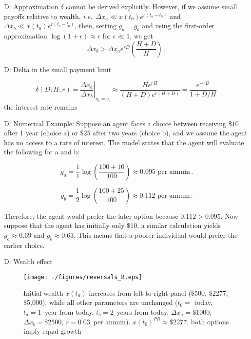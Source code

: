 \documentclass{beamer}
\newcommand{\ie}{{\it i.e.}\ }
\newcommand{\flabel}[1]{\label{fig:#1}}
\newcommand{\be}{\begin{equation}}
\newcommand{\ee}{\end{equation}}
\newcommand{\Dx}{\Delta x}
\newcommand{\del}{D}
\newcommand{\hor}{H}
\numberwithin{equation}{section}
\begin{document}
\begin{frame}{D: Approximation}
$\delta$ cannot be derived explicitly. However, if we assume small payoffs relative to wealth, \ie $\Dx_a \ll x\left(t_0\right)e^{r(t_a-t_0)}$ and $\Dx_b \ll x\left(t_0\right)e^{r(t_b-t_0)}$, then, setting $g_a=g_b$ and using the first-order approximation $\log(1+\epsilon)\approx\epsilon$ for $\epsilon\ll1$, we get
\be
\Dx_b > \Dx_a e^{r\del}\left(\frac{\hor+\del}{\hor}\right)\,,
\ee
\end{frame}




\begin{frame}{D: Delta in the small payment limit}

\be
\delta\left(\del;\hor;r\right) = \left.\frac{\Dx_a}{\Dx_b}\right|_{g_a=g_b} \approx \frac{\hor e^{r\hor}}{\left(\hor + \del\right)e^{r\left(\hor + \del\right)}} = \frac{e^{-r\del}}{1+\del/\hor}\,
\ee
the interest rate remains
\end{frame}


\begin{frame}{D: Numerical Example:}
Suppose an agent faces a choice between receiving $\$10$ after 1 year (choice a) or $\$25$ after two years (choice b), and we assume the agent has no access to a rate of interest. The model states that the agent will evaluate the following for a and b:

\be
g_a = \frac{1}{1}\log\left(\frac{100 + 10}{100}\right) \approx 0.095\text{~per annum}\,.
\ee

\be
g_b = \frac{1}{2}\log\left(\frac{100 + 25}{100}\right) \approx 0.112\text{~per annum}\,.
\ee

Therefore, the agent would prefer the later option because $0.112 > 0.095$. Now suppose that the agent has initially only $\$10$, a similar calculation yields $g_a\approx0.69$ and $g_b\approx0.63$. This means that a poorer individual would prefer the earlier choice.
\end{frame}

\begin{frame}{D: Wealth effect}
\begin{figure}[!htb]
\centering
\texttt{[image: ./figures/reversals\_B.eps]}
\caption{Initial wealth $x(t_0)$ increases from left to right panel (\$500, \$2277, \$5,000), while all other parameters are unchanged ($t_0=$ today, $t_a=1$~year from today, $t_b=2$~years from today, $\Dx_a=\$1000$, $\Dx_b=\$2500$, $r=0.03$~per annum). 
$x(t_0)^{PR}\approx \$2277$, both options imply equal growth}
\flabel{reversal_B}
\end{figure}
\end{frame}
\end{document}
